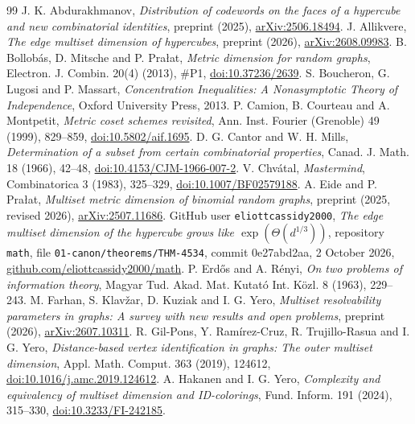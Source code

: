 \documentclass[11pt]{article}
\theoremstyle{definition}
\begin{document}
\begin{thebibliography}{99}
 J. K. Abdurakhmanov, \emph{Distribution of codewords on the faces of a hypercube and new combinatorial identities}, preprint (2025), \href{https://arxiv.org/abs/2506.18494}{arXiv:2506.18494}.
 J. Allikvere, \emph{The edge multiset dimension of hypercubes}, preprint (2026), \href{https://arxiv.org/abs/2608.09983}{arXiv:2608.09983}.
 B. Bollob\'as, D. Mitsche and P. Pra{\l}at, \emph{Metric dimension for random graphs}, Electron. J. Combin. 20(4) (2013), \#P1, \href{https://doi.org/10.37236/2639}{doi:10.37236/2639}.
 S. Boucheron, G. Lugosi and P. Massart, \emph{Concentration Inequalities: A Nonasymptotic Theory of Independence}, Oxford University Press, 2013.
 P. Camion, B. Courteau and A. Montpetit, \emph{Metric coset schemes revisited}, Ann. Inst. Fourier (Grenoble) 49 (1999), 829--859, \href{https://doi.org/10.5802/aif.1695}{doi:10.5802/aif.1695}.
 D. G. Cantor and W. H. Mills, \emph{Determination of a subset from certain combinatorial properties}, Canad. J. Math. 18 (1966), 42--48, \href{https://doi.org/10.4153/CJM-1966-007-2}{doi:10.4153/CJM-1966-007-2}.
 V. Chv\'atal, \emph{Mastermind}, Combinatorica 3 (1983), 325--329, \href{https://doi.org/10.1007/BF02579188}{doi:10.1007/BF02579188}.
 A. Eide and P. Pra{\l}at, \emph{Multiset metric dimension of binomial random graphs}, preprint (2025, revised 2026), \href{https://arxiv.org/abs/2507.11686}{arXiv:2507.11686}.
 GitHub user \texttt{eliottcassidy2000}, \emph{The edge multiset dimension of the hypercube grows like \(\exp(\Theta(d^{1/3}))\)}, repository \texttt{math}, file \texttt{01-canon/theorems/THM-4534}, commit 0e27abd2aa, 2 October 2026, \href{https://github.com/eliottcassidy2000/math}{github.com/eliottcassidy2000/math}.
 P. Erd\H{o}s and A. R\'enyi, \emph{On two problems of information theory}, Magyar Tud. Akad. Mat. Kutat\'o Int. K\"ozl. 8 (1963), 229--243.
 M. Farhan, S. Klav\v{z}ar, D. Kuziak and I. G. Yero, \emph{Multiset resolvability parameters in graphs: A survey with new results and open problems}, preprint (2026), \href{https://arxiv.org/abs/2607.10311}{arXiv:2607.10311}.
 R. Gil-Pons, Y. Ram\'irez-Cruz, R. Trujillo-Rasua and I. G. Yero, \emph{Distance-based vertex identification in graphs: The outer multiset dimension}, Appl. Math. Comput. 363 (2019), 124612, \href{https://doi.org/10.1016/j.amc.2019.124612}{doi:10.1016/j.amc.2019.124612}.
 A. Hakanen and I. G. Yero, \emph{Complexity and equivalency of multiset dimension and ID-colorings}, Fund. Inform. 191 (2024), 315--330, \href{https://doi.org/10.3233/FI-242185}{doi:10.3233/FI-242185}.

\end{thebibliography}
\end{document}
